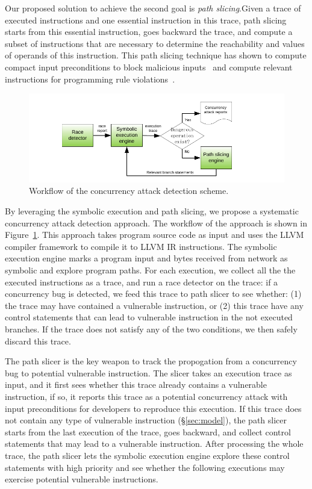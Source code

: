 Our proposed solution to achieve the second goal is \emph{path slicing}.Given a 
trace of executed instructions and one essential instruction in this trace, 
path slicing starts from this essential instruction, goes backward the trace, 
and compute a subset of instructions that are necessary to determine the 
reachability and values of operands of this instruction. This path slicing 
technique has shown to compute compact input preconditions to block malicious 
inputs~\cite{castro:bouncer} and compute relevant instructions for programming 
rule violations~\cite{woodpecker:asplos13}.

\begin{figure}[ht]
\centering
\includegraphics[width=0.5\columnwidth]{figures/detection}
\vspace{-.05in}
\caption{{Workflow of the concurrency attack detection scheme.}} 
\label{fig:detection}
\vspace{-.05in}
\end{figure}

By leveraging the symbolic execution and path slicing, we propose a systematic 
concurrency attack detection approach. The workflow of the approach is shown in 
Figure~\ref{fig:detection}. This approach takes program source code as input 
and uses the LLVM compiler framework to compile it to LLVM IR instructions. The 
symbolic execution engine marks a program input and bytes received from network 
as symbolic and explore program paths. For each execution, we collect all the 
the executed instructions as a trace, and run a race detector on the trace: if 
a concurrency bug is detected, we feed this trace to path slicer to see 
whether: (1) the trace may have contained a vulnerable instruction, or (2) 
this trace have any control statements that can lead to vulnerable instruction 
in the not executed branches. If the trace does not satisfy any of the two 
conditions, we then safely discard this trace.

The path slicer is the key weapon to track the propogation from a concurrency 
bug to potential vulnerable instruction. The slicer takes an execution trace as 
input, and it first sees whether this trace already contains a vulnerable 
instruction, if so, it reports this trace as a potential concurrency attack with 
input preconditions for developers to reproduce this execution. If this trace 
does not contain any type of vulnerable instruction (\S\ref{sec:model}), the 
path slicer starts from the last execution of the trace, goes backward, and 
collect control statements that may lead to a vulnerable instruction. After 
processing the whole trace, the path slicer lets the symbolic execution engine 
explore these control statements with high priority and see whether the 
following executions may exercise potential vulnerable instructions.

